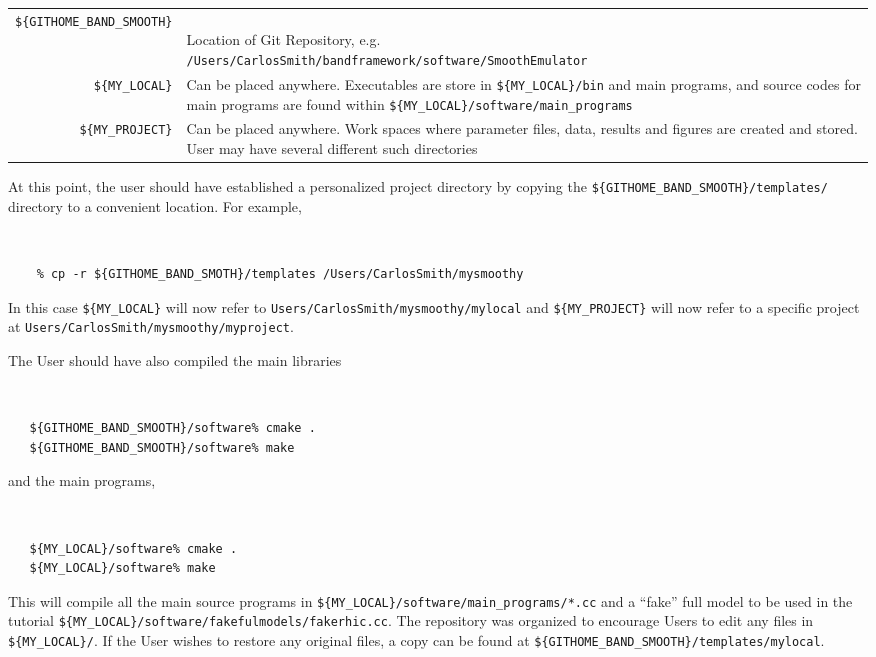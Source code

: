\documentclass[UserManual.tex]{subfiles}
\begin{document}
\begin{tabular}{rl}\hline
{\tt \$\{GITHOME\_BAND\_SMOOTH\}} & \parbox{5in}{~\\Location of Git Repository, e.g.\\{\tt /Users/CarlosSmith/bandframework/software/SmoothEmulator}\\}\\
{\tt \$\{MY\_LOCAL\}} & \parbox{5in}{Can be placed anywhere. Executables are store in\\ {\tt \$\{MY\_LOCAL\}/bin} and main programs, and source codes for main\\ programs are found within {\tt \$\{MY\_LOCAL\}/software/main\_programs}\\}\\
{\tt \$\{MY\_PROJECT\}} & \parbox{5in}{Can be placed anywhere. Work spaces where parameter files, data, results and figures are created and stored. User may have several different such directories\\}\\
 \hline
\end{tabular}

At this point, the user should have established a personalized project directory by copying the {\tt \$\{GITHOME\_BAND\_SMOOTH\}/templates/} directory to a convenient location. For example,
{\tt
\begin{verbatim}
	% cp -r ${GITHOME_BAND_SMOTH}/templates /Users/CarlosSmith/mysmoothy
\end{verbatim}}
In this case {\tt \$\{MY\_LOCAL\}} will now refer to {\tt Users/CarlosSmith/mysmoothy/mylocal} and {\tt \$\{MY\_PROJECT\}} will now refer to a specific project at {\tt Users/CarlosSmith/mysmoothy/myproject}.

The User should have also compiled the main libraries
{\tt
\begin{verbatim}
   ${GITHOME_BAND_SMOOTH}/software% cmake .
   ${GITHOME_BAND_SMOOTH}/software% make
\end{verbatim}
}
and the main programs,
{\tt
\begin{verbatim}
   ${MY_LOCAL}/software% cmake .
   ${MY_LOCAL}/software% make
\end{verbatim}
}
This will compile all the main source programs in {\tt \$\{MY\_LOCAL\}/software/main\_programs/*.cc} and a ``fake'' full model to be used in the tutorial {\tt \$\{MY\_LOCAL\}/software/fakefulmodels/fakerhic.cc}. The repository was organized to encourage Users to edit any files in {\tt \$\{MY\_LOCAL\}/}. If the User wishes to restore any original files, a copy can be found at {\tt \$\{GITHOME\_BAND\_SMOOTH\}/templates/mylocal}.
\end{document}
